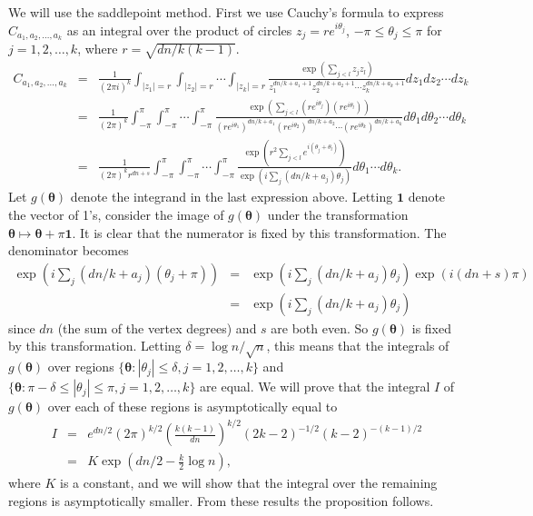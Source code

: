 \documentclass[12pt]{article}
\newcommand{\proofof}[1]{\par\noindent{\bf Proof of #1.\enspace}\rm}
\begin{document}
\proofof{Lemma~\ref{lem:C(s)}}
We will use the saddlepoint method.
First we use Cauchy's formula to express $C_{a_1, a_2,\ldots, a_k}$ as an integral over
the product of circles $z_j = re^{i\theta_j}$, 
 $-\pi \leq \theta_j \leq \pi$
 for $j=1, 2, \ldots, k$,
where $r = \sqrt{dn/k(k-1)}$.
\begin{eqnarray*}
C_{a_1, a_2,\ldots, a_k} &=&
\frac{1}{(2\pi i)^k}
\int_{|z_1|=r}
\int_{|z_2|=r}
\cdots
\int_{|z_k|=r}
\frac{ \exp\left(\sum_{j<l} z_j z_l \right) }
{ z_1^{dn/k + a_1 + 1} z_2^{dn/k + a_2 + 1} \cdots
  z_k^{dn/k + a_k + 1}
}
dz_1 dz_2 \cdots dz_k
\\
&=&
\frac{1}{(2\pi)^k}
\int_{-\pi}^{\pi}
\int_{-\pi}^{\pi}
\cdots
\int_{-\pi}^{\pi}
\frac{ \exp\left(\sum_{j<l} (r e^{i\theta_j})(r e^{i\theta_l})\right) }
{ (re^{i\theta_1})^{dn/k + a_1 } (re^{i\theta_2})^{dn/k + a_2 } \cdots
  (re^{i\theta_k })^{dn/k + a_k }
}
  d\theta_1 d\theta_2 \cdots d\theta_k
\\
&=&
\frac{1}{(2\pi)^k r^{dn + s}}
\int_{-\pi}^{\pi}
\int_{-\pi}^{\pi}
\cdots
\int_{-\pi}^{\pi}
\frac{ \exp ( r^2 \sum_{j<l} e^{i(\theta_j + \theta_l)})}
      { \exp (i \sum_j (dn/k + a_j) \theta_j ) }
d\theta_1 \cdots d\theta_k.
\end{eqnarray*}
Let $g(\mathbf{\theta})$ denote the integrand in the last expression above.
Letting $\mathbf{1}$ denote the vector of 1's, consider the image of
$g(\mathbf{\theta})$ under the transformation
$\mathbf{\theta} \mapsto \mathbf{\theta} + \pi \mathbf{1}$. It is clear
that the numerator is fixed by this transformation. The denominator
becomes
\begin{eqnarray*}
\exp (i \sum_j (dn/k + a_j) (\theta_j  + \pi) )
&=&
\exp (i \sum_j (dn/k + a_j) \theta_j )
\exp (i (dn + s)  \pi )
\\
&=&
\exp (i \sum_j (dn/k + a_j) \theta_j )
\end{eqnarray*}
since $dn$ (the sum of the vertex degrees) and $s$ are both even. So
$g(\mathbf{\theta})$ is fixed by this transformation.
Letting $\delta = \log n / \sqrt{n}$, this means that the integrals of
$g(\mathbf{\theta})$ over regions
$\{ \mathbf{\theta} : |\theta_j| \leq \delta, j = 1, 2, \ldots, k \}$
and 
$\{ \mathbf{\theta} : \pi - \delta \leq |\theta_j| \leq \pi, j = 1, 2, \ldots, k \}$
are equal.
We will prove that the integral $I$ of $g(\mathbf{\theta})$ over each 
of these regions is asymptotically equal to
\begin{eqnarray*}
I &=&
e^{dn/2}
(2\pi)^{k/2}
\left(
\frac{k(k-1)}{dn}
\right)^{k/2}
(2k-2)^{-1/2}
(k-2)^{-(k-1)/2}
\\
&=&
K\exp\left( dn/2 -\frac{k}{2} \log n \right),
\end{eqnarray*}
where $K$ is a constant, and we will show that the integral over the 
remaining regions is asymptotically smaller.
 From these results the proposition follows.
\end{document}

